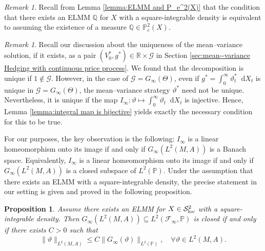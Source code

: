 \documentclass[11pt,a4paper,twoside,openany]{report}
\numberwithin{equation}{section}
\newcommand{\diff}{\mathop{}\!\mathrm{d}}
\theoremstyle{plain} %
\newtheorem{proposition}[theorem]{Proposition}
\theoremstyle{definition} %
\theoremstyle{remark} %
\newtheorem{remark}[theorem]{Remark}
\begin{document}
\begin{remark}
    Recall from Lemma \ref{lemma:ELMM and P_e^2(X)} that the condition that there exists an ELMM \(\mathbb{Q}\) for \(X\) with a square-integrable density is equivalent to assuming the existence of a measure \(\mathbb{Q}\in\mathbb{P}_e^2(X)\).
\end{remark}
\begin{remark}
    Recall our discussion about the uniqueness of the mean--variance solution, if it exists, as a pair \((V_0^*,g^*)\in\mathbb{R}\times\mathcal{G}\) in Section \ref{sec:mean--variance Hedging with continuous price process}. We found that the decomposition is unique if \(1\notin\mathcal{G}\). However, in the case of \(\mathcal{G}=G_{\infty}(\Theta)\), even if \(g^*=\int_0^\infty\vartheta^*_t\diff X_t\) is unique in \(\mathcal{G}=G_{\infty}(\Theta)\), the mean--variance strategy \(\vartheta^*\) need not be unique. Nevertheless, it is unique if the map \(I_{\infty}:\vartheta\mapsto\int_0^\infty\vartheta_t\diff X_t\) is injective. Hence, Lemma \ref{lemma:integral map is bijective} yields exactly the necessary condition for this to be true. 
\end{remark}
For our purposes, the key observation is the following:
      \(I_{\infty}\) is a linear homeomorphism onto its image if and only if \(G_{\infty}(L^2(M,A))\) is a Banach space. Equivalently, \(I_{\infty}\) is a linear homeomorphism onto its image if and only if \(G_{\infty}(L^2(M,A))\) is a closed subspace of \(L^2(\mathbb{P})\).
Under the assumption that there exists an ELMM with a square-integrable density, the precise statement in our setting is given and proved in the following proposition.
\begin{proposition}\label{prop:closedness of G_T in L^2 functional analytic iff condition}
Assume there exists an ELMM for \(X\in\mathcal{S}^2_{\rm{loc}}\) with a square-integrable density. Then
 \(G_{\infty}(L^2(M,A))\subseteq 
L^2(\mathcal{F}_{\infty},\mathbb{P})\) is closed if and only if there exists \(C>0\) such that 
\begin{equation}\label{eq:homeo condition}
    \lVert \vartheta\rVert_{L^2(M,A)}\leq C\lVert G_{\infty}(\vartheta)\rVert_{L^2(\mathbb{P})},\quad\forall\vartheta\in L^2(M,A).
\end{equation}
\end{proposition}
\end{document}
